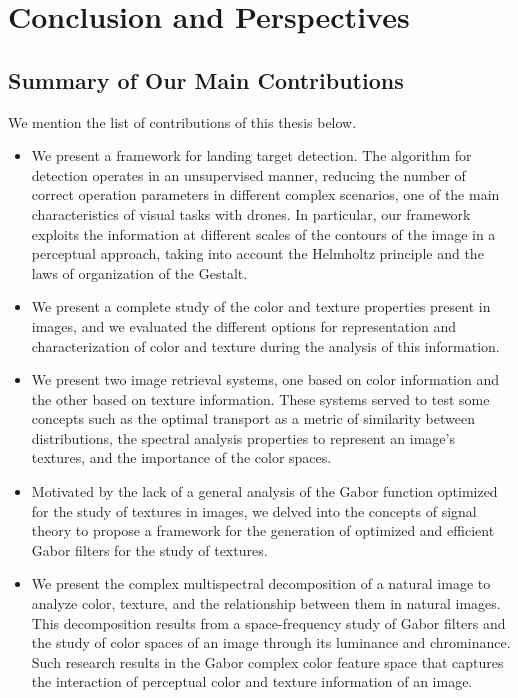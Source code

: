 \chapter*{Conclusion and Perspectives}\label{ch:general_conclusion}

\section*{Summary of Our Main Contributions}


We mention the list of contributions of this thesis below.

\begin{itemize}
	\item We present a framework for landing target detection. The algorithm for detection operates in an unsupervised manner, reducing the number of correct operation parameters in different complex scenarios, one of the main characteristics of visual tasks with drones. In particular, our framework exploits the information at different scales of the contours of the image in a perceptual approach, taking into account the Helmholtz principle and the laws of organization of the Gestalt.
	\item We present a complete study of the color and texture properties present in images, and we evaluated the different options for representation and characterization of color and texture during the analysis of this information.
	\item We present two image retrieval systems, one based on color information and the other based on texture information. These systems served to test some concepts such as the optimal transport as a metric of similarity between distributions, the spectral analysis properties to represent an image's textures, and the importance of the color spaces.
	\item Motivated by the lack of a general analysis of the Gabor function optimized for the study of textures in images, we delved into the concepts of signal theory to propose a framework for the generation of optimized and efficient Gabor filters for the study of textures.
	\item We present the complex multispectral decomposition of a natural image to analyze color, texture, and the relationship between them in natural images. This decomposition results from a space-frequency study of Gabor filters and the study of color spaces of an image through its luminance and chrominance. Such research results in the Gabor complex color feature space that captures the interaction of perceptual color and texture information of an image.

\end{itemize}
